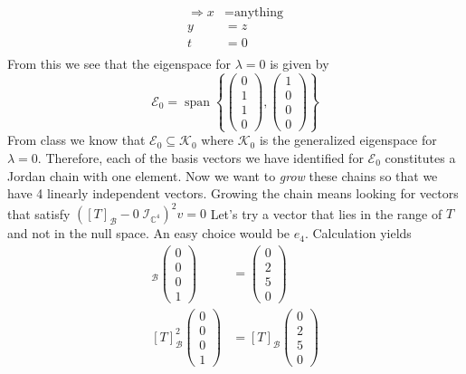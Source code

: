 \documentclass[a4paper, 11pt]{article}
\newcommand{\C}{\mathbb{C}}
\newenvironment{solution}{%
	\begin{list}{}{%
			\setlength{\topsep}{0pt}%
			\setlength{\leftmargin}{1.5cm}%
			\setlength{\rightmargin}{1.5cm}%
			\setlength{\listparindent}{\parindent}%
			\setlength{\itemindent}{\parindent}%
			\setlength{\parsep}{\parskip}%
		}%
		\item[]}{\end{list}}
\begin{document}
\begin{solution}
\begin{align*}
    \Rightarrow x &= \text{anything} \\
    y &= z \\
    t &= 0 \\ 
  \end{align*}
  From this we see that the eigenspace for $\lambda=0$ is given by
  \begin{equation*}
    \mathcal{E}_0 = \operatorname{span}\left\{ \begin{pmatrix}0 \\ 1 \\ 1 \\ 0 \end{pmatrix}, \begin{pmatrix}1 \\ 0 \\ 0 \\ 0 \end{pmatrix}\right\}
  \end{equation*}
  From class we know that $\mathcal{E}_0 \subseteq \mathcal{K}_0$ where $\mathcal{K}_0$ is the generalized eigenspace for $\lambda = 0 $. Therefore, each of the basis vectors we have identified for $\mathcal{E}_0$ constitutes a Jordan chain with one element. Now we want to \textit{grow} these chains so that we have 4 linearly independent vectors. Growing the chain means looking for vectors that satisfy $([T]_\mathcal{B}-0\;\mathcal{I}_{\C^4})^2v = 0$ Let's try a vector that lies in the range of $T$ and not in the null space. An easy choice would be $e_4$. Calculation yields
  \begin{align*}
    [T]_\mathcal{B}\begin{pmatrix}0\\0\\0\\1\end{pmatrix} &= \begin{pmatrix}0\\2\\5\\0\end{pmatrix}\\
        [T]_\mathcal{B}^2\begin{pmatrix}0\\0\\0\\1\end{pmatrix} &= [T]_\mathcal{B}\begin{pmatrix}0\\2\\5\\0\end{pmatrix}\\

\end{align*}
\end{solution}
\end{document}
